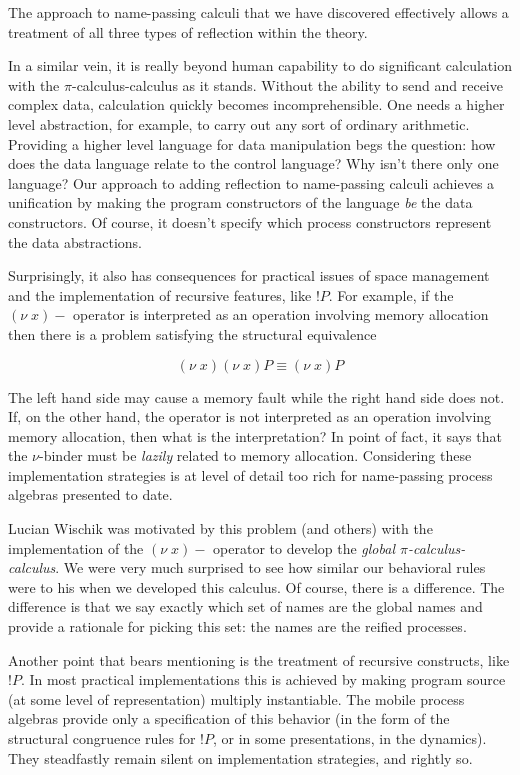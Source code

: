 \documentclass{amsart}
\newcommand{\scong}{\mathbin{\equiv}}
\theoremstyle{definition}
\theoremstyle{remark}
\numberwithin{equation}{subsection}
\newcommand{\pic}{$\pi$-calculus}
\begin{document}
The approach to name-passing calculi that we have discovered
effectively allows a treatment of all three types of reflection within
the theory. 

In a similar vein, it is really beyond human capability to do
significant calculation with the \pic-calculus as it stands. Without
the ability to send and receive complex data, calculation quickly
becomes incomprehensible. One needs a higher level abstraction, for
example, to carry out any sort of ordinary arithmetic. Providing a
higher level language for data manipulation begs the question: how
does the data language relate to the control language? Why isn't there
only one language? Our approach to adding reflection to name-passing
calculi achieves a unification by making the program constructors of
the language \textit{be} the data constructors. Of course, it doesn't
specify which process constructors represent the data abstractions.

Surprisingly, it also has consequences for practical issues of space
management and the implementation of recursive features, like
$!P$. For example, if the $(\nu \; x)-$ operator is interpreted as an
operation involving memory allocation then there is a problem
satisfying the structural equivalence

\begin{equation*}
	(\nu \; x)(\nu \; x)P \scong (\nu \; x)P
\end{equation*}

The left hand side may cause a memory fault while the right hand side
does not. If, on the other hand, the operator is not interpreted as an
operation involving memory allocation, then what is the
interpretation? In point of fact, it says that the $\nu$-binder must
be \textit{lazily} related to memory allocation. Considering these
implementation strategies is at level of detail too rich for
name-passing process algebras presented to date.

Lucian Wischik was motivated by this problem (and others) with the
implementation of the $(\nu \; x)-$ operator to develop the \textit{global
\pic-calculus}. We were very much surprised to see how similar our
behavioral rules were to his when we developed this calculus. Of
course, there is a difference. The difference is that we say exactly
which set of names are the global names and provide a rationale for
picking this set: the names are the reified processes.

Another point that bears mentioning is the treatment of recursive
constructs, like $!P$. In most practical implementations this is
achieved by making program source (at some level of representation)
multiply instantiable. The mobile process algebras provide only a
specification of this behavior (in the form of the structural
congruence rules for $!P$, or in some presentations, in the
dynamics). They steadfastly remain silent on implementation
strategies, and rightly so. 
\end{document}

